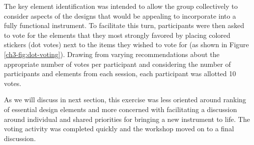 \documentclass[letterpaper, 12pt]{article}
\begin{document}
The key element identification was intended to allow the group collectively to consider aspects of the designs that would be appealing to incorporate into a fully functional instrument. To facilitate this turn, participants were then asked to vote for the elements that they most strongly favored by placing colored stickers (dot votes) next to the items they wished to vote for (as shown in Figure \ref{ch3-fig:dot-voting}). 
Drawing from varying recommendations about the appropriate number of votes per participant \citep{Gray2010, Gibbons2019} and considering the number of participants and elements from each session, each participant was allotted 10 votes.

As we will discuss in next section, this exercise was less oriented around ranking of essential design elements and more concerned with facilitating a discussion around individual and shared priorities for bringing a new instrument to life. The voting activity was completed quickly and the workshop moved on to a final discussion.
\end{document}
